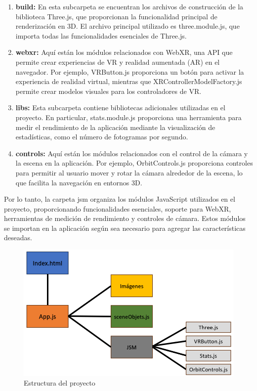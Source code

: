 \documentclass[a4paper, 12pt]{book}
\begin{document}
\begin{itemize}
  \begin{enumerate}
    \item \textbf{build:} En esta subcarpeta se encuentran los archivos de construcción de la biblioteca Three.js, 
    que proporcionan la funcionalidad principal de renderización en 3D. El archivo principal utilizado es three.module.js, 
    que importa todas las funcionalidades esenciales de Three.js.
    \item \textbf{webxr:} Aquí están los módulos relacionados con WebXR, una API que permite crear experiencias de VR y realidad aumentada (AR) en el navegador. 
    Por ejemplo, VRButton.js proporciona un botón para activar la experiencia de realidad virtual, mientras que XRControllerModelFactory.js 
    permite crear modelos visuales para los controladores de VR.
    \item \textbf{libs:} Esta subcarpeta contiene bibliotecas adicionales utilizadas en el proyecto. 
    En particular, stats.module.js proporciona una herramienta para medir el rendimiento de la aplicación 
    mediante la visualización de estadísticas, como el número de fotogramas por segundo.
    \item \textbf{controls:} Aquí están los módulos relacionados con el control de la cámara y la escena en la aplicación. 
    Por ejemplo, OrbitControls.js proporciona controles para permitir al usuario mover y rotar la cámara 
    alrededor de la escena, lo que facilita la navegación en entornos 3D.
  \end{enumerate}

  Por lo tanto, la carpeta jsm organiza los módulos JavaScript utilizados en el proyecto, 
  proporcionando funcionalidades esenciales, soporte para WebXR, herramientas de medición de rendimiento y controles de cámara. 
  Estos módulos se importan en la aplicación según sea necesario para agregar las características deseadas.

\end{itemize}

\begin{figure}
  \centering
  \includegraphics[width=12cm, keepaspectratio]{img/estructura.png}
  \caption{Estructura del proyecto}
  \label{fig:arquitectura}
\end{figure}
\end{document}
